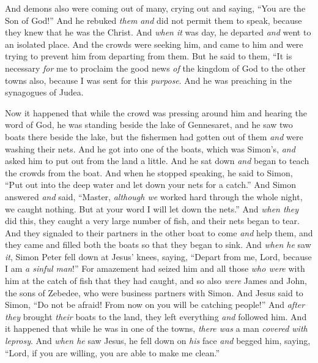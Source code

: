 \begin{biblechapter}
\verse And demons also were coming out of many, crying out and saying, “You are the Son of God!” And he rebuked \textit{them} \textit{and} did not permit them to speak, because they knew that he was the Christ.
\verse And \textit{when it} was day, he departed \textit{and} went to an isolated place. And the crowds were seeking him, and came to him and were trying to prevent him from departing from them.
\verse But he said to them, “It is necessary \textit{for} me to proclaim the good news \textit{of} the kingdom of God to the other towns also, because I was sent for this \textit{purpose}.
\verse And he was preaching in the synagogues of Judea.
\end{biblechapter}

\begin{biblechapter} %
 Now it happened that while the crowd was pressing around him and hearing the word of God, he was standing beside the lake of Gennesaret,
\verse and he saw two boats there beside the lake, but the fishermen had gotten out of them \textit{and} were washing their nets.
\verse And he got into one of the boats, which was Simon’s, \textit{and} asked him to put out from the land a little. And he sat down \textit{and} began to teach the crowds from the boat.
\verse And when he stopped speaking, he said to Simon, “Put out into the deep water and let down your nets for a catch.”
\verse And Simon answered \textit{and} said, “Master, \textit{although we} worked hard through the whole night, we caught nothing. But at your word I will let down the nets.”
\verse And \textit{when they} did this, they caught a very large number of fish, and their nets began to tear.
\verse And they signaled to their partners in the other boat to come \textit{and} help them, and they came and filled both the boats so that they began to sink.
\verse And \textit{when he} saw \textit{it}, Simon Peter fell down at Jesus’ knees, saying, “Depart from me, Lord, because I am \textit{a sinful man}!”
\verse For amazement had seized him and all those \textit{who were} with him at the catch of fish that they had caught,
\verse and so also \textit{were} James and John, the sons of Zebedee, who were business partners with Simon. And Jesus said to Simon, “Do not be afraid! From now on you will be catching people!”
\verse And \textit{after they} brought \textit{their} boats to the land, they left everything \textit{and} followed him.
 And it happened that while he was in one of the towns, \textit{there was} a man \textit{covered with leprosy}. And \textit{when he} saw Jesus, he fell down on \textit{his} face \textit{and} begged him, saying, “Lord, if you are willing, you are able to make me clean.”

\end{biblechapter}
